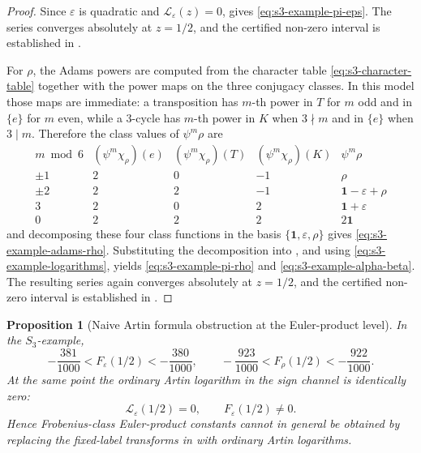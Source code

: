 \documentclass[11pt,a4paper]{amsart}
\theoremstyle{plain}
\newtheorem{proposition}[theorem]{Proposition}
\theoremstyle{definition}
\theoremstyle{remark}
\begin{document}
\begin{proof}
  Since \(\varepsilon\) is quadratic and
  \(\mathcal L_\varepsilon(z)=0\), 
  gives \eqref{eq:s3-example-pi-eps}. The series converges absolutely
  at \(z=1/2\), and the certified non-zero interval is established in
  .

  For \(\rho\), the Adams powers are computed from the character table
  \eqref{eq:s3-character-table} together with the power maps on the
  three conjugacy classes. In this model those maps are immediate: a
  transposition has \(m\)-th power in \(T\) for \(m\) odd and in
  \(\{e\}\) for \(m\) even, while a \(3\)-cycle has \(m\)-th power in
  \(K\) when \(3\nmid m\) and in \(\{e\}\) when \(3\mid m\). Therefore
  the class values of \(\psi^m\rho\) are
  \[
    \begin{array}{c|ccc|c}
      m \bmod 6
      & (\psi^m\chi_\rho)(e)
      & (\psi^m\chi_\rho)(T)
      & (\psi^m\chi_\rho)(K)
      & \psi^m\rho \\ \hline
      \pm 1 & 2 & 0 & -1 & \rho \\
      \pm 2 & 2 & 2 & -1 & \mathbf 1-\varepsilon+\rho \\
      3 & 2 & 0 & 2 & \mathbf 1+\varepsilon \\
      0 & 2 & 2 & 2 & 2\mathbf 1
    \end{array}
  \]
  and decomposing these four class functions in the basis
  \(\{\mathbf 1,\varepsilon,\rho\}\) gives
  \eqref{eq:s3-example-adams-rho}. Substituting the decomposition into
  , and using
  \eqref{eq:s3-example-logarithms}, yields
  \eqref{eq:s3-example-pi-rho} and \eqref{eq:s3-example-alpha-beta}.
  The resulting series again converges absolutely at \(z=1/2\), and the
  certified non-zero interval is established in
  .
\end{proof}

\begin{proposition}[Naive Artin formula obstruction at the Euler-product
  level]
  \label{prop:s3-naive-artin-obstruction}
  In the \(S_3\)-example,
  \begin{equation}\label{eq:s3-f-level-windows}
    -\frac{381}{1000}<F_\varepsilon(1/2)<-\frac{380}{1000},
    \qquad
    -\frac{923}{1000}<F_\rho(1/2)<-\frac{922}{1000}.
  \end{equation}
  At the same point the ordinary Artin logarithm in the sign channel is
  identically zero:
  \begin{equation}\label{eq:s3-artin-zero-f-nonzero}
    \mathcal L_\varepsilon(1/2)=0,
    \qquad
    F_\varepsilon(1/2)\neq0.
  \end{equation}
  Hence Frobenius-class Euler-product constants cannot in general be
  obtained by replacing the fixed-label transforms in
   with ordinary Artin logarithms.
\end{proposition}
\end{document}
